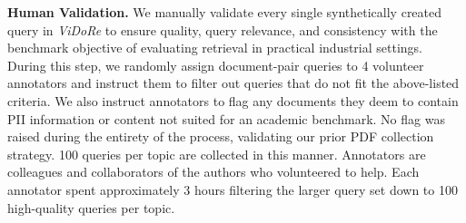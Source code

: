 \documentclass{article} %
\begin{document}



\noindent\textbf{Human Validation.} We manually validate every single synthetically created query in \textit{ViDoRe} to ensure quality, query relevance, and consistency with the benchmark objective of evaluating retrieval in practical industrial settings. During this step, we randomly assign document-pair queries to 4 volunteer annotators and instruct them to filter out queries that do not fit the above-listed criteria. We also instruct annotators to flag any documents they deem to contain PII information or content not suited for an academic benchmark. No flag was raised during the entirety of the process, validating our prior PDF collection strategy. 100 queries per topic are collected in this manner. Annotators are colleagues and collaborators of the authors who volunteered to help. Each annotator spent approximately 3 hours filtering the larger query set down to 100 high-quality queries per topic.
\end{document}
